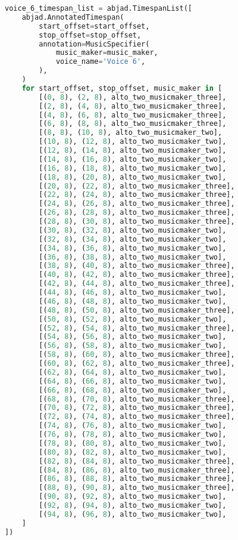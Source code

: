 \begin{lstlisting}[language=Python, caption=Invocation Source Code]
voice_6_timespan_list = abjad.TimespanList([
    abjad.AnnotatedTimespan(
        start_offset=start_offset,
        stop_offset=stop_offset,
        annotation=MusicSpecifier(
            music_maker=music_maker,
            voice_name='Voice 6',
        ),
    )
    for start_offset, stop_offset, music_maker in [
        [(0, 8), (2, 8), alto_two_musicmaker_three],
        [(2, 8), (4, 8), alto_two_musicmaker_three],
        [(4, 8), (6, 8), alto_two_musicmaker_three],
        [(6, 8), (8, 8), alto_two_musicmaker_three],
        [(8, 8), (10, 8), alto_two_musicmaker_two],
        [(10, 8), (12, 8), alto_two_musicmaker_two],
        [(12, 8), (14, 8), alto_two_musicmaker_two],
        [(14, 8), (16, 8), alto_two_musicmaker_two],
        [(16, 8), (18, 8), alto_two_musicmaker_two],
        [(18, 8), (20, 8), alto_two_musicmaker_two],
        [(20, 8), (22, 8), alto_two_musicmaker_three],
        [(22, 8), (24, 8), alto_two_musicmaker_three],
        [(24, 8), (26, 8), alto_two_musicmaker_three],
        [(26, 8), (28, 8), alto_two_musicmaker_three],
        [(28, 8), (30, 8), alto_two_musicmaker_three],
        [(30, 8), (32, 8), alto_two_musicmaker_two],
        [(32, 8), (34, 8), alto_two_musicmaker_two],
        [(34, 8), (36, 8), alto_two_musicmaker_two],
        [(36, 8), (38, 8), alto_two_musicmaker_two],
        [(38, 8), (40, 8), alto_two_musicmaker_three],
        [(40, 8), (42, 8), alto_two_musicmaker_three],
        [(42, 8), (44, 8), alto_two_musicmaker_three],
        [(44, 8), (46, 8), alto_two_musicmaker_two],
        [(46, 8), (48, 8), alto_two_musicmaker_two],
        [(48, 8), (50, 8), alto_two_musicmaker_three],
        [(50, 8), (52, 8), alto_two_musicmaker_two],
        [(52, 8), (54, 8), alto_two_musicmaker_three],
        [(54, 8), (56, 8), alto_two_musicmaker_two],
        [(56, 8), (58, 8), alto_two_musicmaker_two],
        [(58, 8), (60, 8), alto_two_musicmaker_three],
        [(60, 8), (62, 8), alto_two_musicmaker_three],
        [(62, 8), (64, 8), alto_two_musicmaker_two],
        [(64, 8), (66, 8), alto_two_musicmaker_two],
        [(66, 8), (68, 8), alto_two_musicmaker_two],
        [(68, 8), (70, 8), alto_two_musicmaker_three],
        [(70, 8), (72, 8), alto_two_musicmaker_three],
        [(72, 8), (74, 8), alto_two_musicmaker_three],
        [(74, 8), (76, 8), alto_two_musicmaker_two],
        [(76, 8), (78, 8), alto_two_musicmaker_two],
        [(78, 8), (80, 8), alto_two_musicmaker_two],
        [(80, 8), (82, 8), alto_two_musicmaker_two],
        [(82, 8), (84, 8), alto_two_musicmaker_three],
        [(84, 8), (86, 8), alto_two_musicmaker_three],
        [(86, 8), (88, 8), alto_two_musicmaker_three],
        [(88, 8), (90, 8), alto_two_musicmaker_three],
        [(90, 8), (92, 8), alto_two_musicmaker_two],
        [(92, 8), (94, 8), alto_two_musicmaker_two],
        [(94, 8), (96, 8), alto_two_musicmaker_two],
    ]
])


\end{lstlisting}
